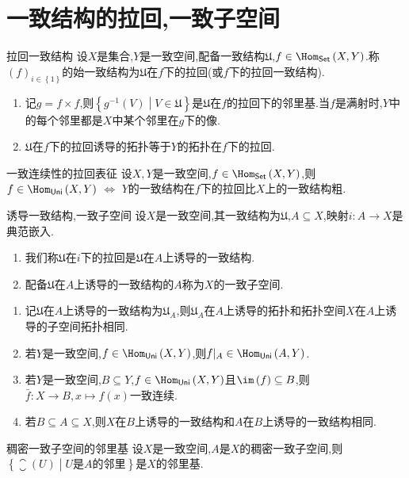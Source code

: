 \section{一致结构的拉回,一致子空间}

\begin{definition}{拉回一致结构}{}
	设$X$是集合,$Y$是一致空间,配备一致结构$\mathfrak{U}$,$f\in\Hom_{\mathsf{Set}}\left(X,Y\right)$.称$\left(f\right)_{i\in\left\{1\right\}}$的始一致结构为$\mathfrak{U}$在$f$下的拉回(或$f$下的拉回一致结构).
\end{definition}

\begin{remark}{}{}
	\begin{enumerate}
		\item 记$g=f\times f$,则$\left\{g^{-1}\left(V\right)\middle|V\in\mathfrak{U}\right\}$是$\mathfrak{U}$在$f$的拉回下的邻里基.当$f$是满射时,$Y$中的每个邻里都是$X$中某个邻里在$g$下的像.
		\item $\mathfrak{U}$在$f$下的拉回诱导的拓扑等于$Y$的拓扑在$f$下的拉回.
	\end{enumerate}
\end{remark}

\begin{proposition}{一致连续性的拉回表征}{}
	设$X,Y$是一致空间,$f\in\Hom_{\mathsf{Set}}\left(X,Y\right)$,则$f\in\Hom_{\mathsf{Uni}}\left(X,Y\right)$ $\iff$ $Y$的一致结构在$f$下的拉回比$X$上的一致结构粗.
\end{proposition}

\begin{definition}{诱导一致结构,一致子空间}{}
	设$X$是一致空间,其一致结构为$\mathfrak{U}$,$A\subseteq X$,映射$i:A\to X$是典范嵌入.
	\begin{enumerate}
		\item 我们称$\mathfrak{U}$在$i$下的拉回是$\mathfrak{U}$在$A$上诱导的一致结构.
		\item 配备$\mathfrak{U}$在$A$上诱导的一致结构的$A$称为$X$的一致子空间.
	\end{enumerate}
\end{definition}

\begin{remark}{}{}
	\begin{enumerate}
		\item 记$\mathfrak{U}$在$A$上诱导的一致结构为$\mathfrak{U}_{A}$,则$\mathfrak{U}_{A}$在$A$上诱导的拓扑和拓扑空间$X$在$A$上诱导的子空间拓扑相同.
		\item 若$Y$是一致空间,$f\in\Hom_{\mathsf{Uni}}\left(X,Y\right)$,则$f|_{A}\in\Hom_{\mathsf{Uni}}\left(A,Y\right)$.
		\item 若$Y$是一致空间,$B\subseteq Y$,$f\in\Hom_{\mathsf{Uni}}\left(X,Y\right)$且$\im\left(f\right)\subseteq B$,则$\bar{f}:X\to B,x\mapsto f\left(x\right)$一致连续.
		\item 若$B\subseteq A\subseteq X$,则$X$在$B$上诱导的一致结构和$A$在$B$上诱导的一致结构相同.
	\end{enumerate}
\end{remark}

\begin{proposition}{稠密一致子空间的邻里基}{}
	设$X$是一致空间,$A$是$X$的稠密一致子空间,则$\left\{\closure\left(U\right)\middle|U\text{是}A\text{的邻里}\right\}$是$X$的邻里基.
\end{proposition}
